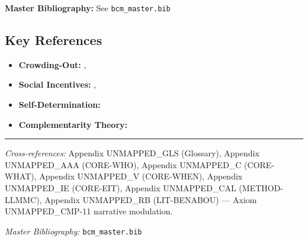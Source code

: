 \begin{tcolorbox}[colback=blue!5!white, colframe=blue!75!black]
\textbf{Master Bibliography:} See \texttt{bcm\_master.bib}
\end{tcolorbox}

\subsection{Key References}

\begin{itemize}[nosep]
\item \textbf{Crowding-Out:} \citet{frey1997relationship}, \citet{deci1999meta}
\item \textbf{Social Incentives:} \citet{gneezy2011pay}, \citet{ariely2009doing}
\item \textbf{Self-Determination:} \citet{ryan2000self}
\item \textbf{Complementarity Theory:} \citet{milgrom1990job}
\end{itemize}

\nocite{bcm_master}


\vspace{1em}
\hrule
\vspace{0.5em}

\noindent\textit{Cross-references:}
Appendix UNMAPPED_GLS (Glossary),
Appendix UNMAPPED_AAA (CORE-WHO),
Appendix UNMAPPED_C (CORE-WHAT),
Appendix UNMAPPED_V (CORE-WHEN),
Appendix UNMAPPED_IE (CORE-EIT),
Appendix UNMAPPED_CAL (METHOD-LLMMC),
Appendix UNMAPPED_RB (LIT-BENABOU) --- Axiom UNMAPPED_CMP-11 narrative modulation.

\noindent\textit{Master Bibliography:} \texttt{bcm\_master.bib}

